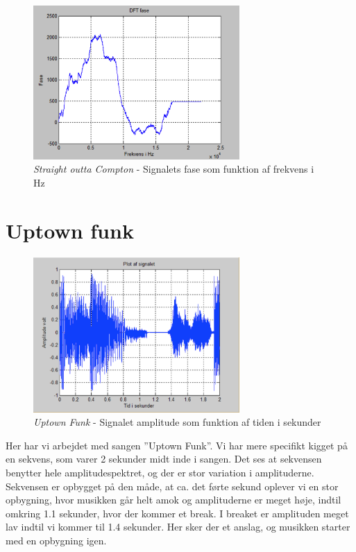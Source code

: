 \begin{figure}[H]
	\centering
	\includegraphics[width=0.7\textwidth]{Figurer/Snip20151001_19}
	\caption{\textit{Straight outta Compton} - Signalets fase som funktion af frekvens i Hz}
\end{figure} 

\section{Uptown funk}

\begin{figure}[H]
	\centering
	\includegraphics[width=0.7\textwidth]{Figurer/UptownFunk}
	\caption{\textit{Uptown Funk} - Signalet amplitude som funktion af tiden i sekunder}
\end{figure}

Her har vi arbejdet med sangen ”Uptown Funk”. Vi har mere specifikt kigget på en sekvens, som varer 2 sekunder midt inde i sangen. Det ses at sekvensen benytter hele amplitudespektret, og der er stor variation i amplituderne. Sekvensen er opbygget på den måde, at ca. det førte sekund oplever vi en stor opbygning, hvor musikken går helt amok og amplituderne er meget høje, indtil omkring 1.1 sekunder, hvor der kommer et break. I breaket er amplituden meget lav indtil vi kommer til 1.4 sekunder. Her sker der et anslag, og musikken starter med en opbygning igen. 

